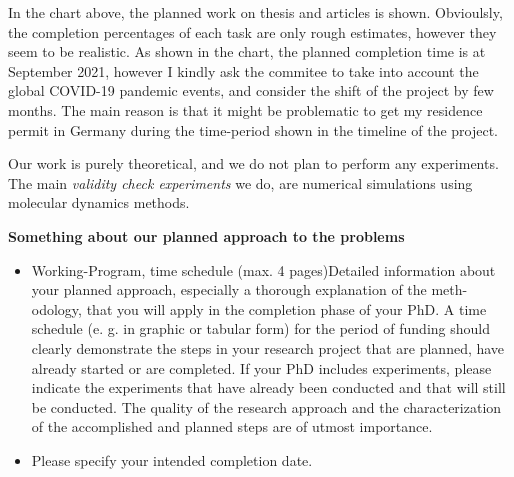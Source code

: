 \documentclass[11pt, notitlepage]{article} %
\begin{document}
In the chart above, the planned work on thesis and articles is shown. Obvioulsly, the completion percentages of each task are 
only rough estimates, however they seem to be realistic. As shown in the chart, the planned completion time is at September 2021,
however I kindly ask the commitee to take into account the global COVID-19 pandemic events, and consider the shift of the project 
by few months. The main reason is that it might be problematic to get my residence permit in Germany during the time-period 
shown in the timeline of the project.

Our work is purely theoretical, and we do not plan to perform any experiments. The main \emph{validity check experiments} 
we do, are numerical simulations using molecular dynamics methods. 

\textbf{Something about our planned approach to the problems}

\begin{itemize}
    \item Working-Program, time schedule (max. 4 pages)Detailed information about your planned approach, especially a thorough explanation of the meth-odology, 
	that you will apply in the completion phase of your  PhD. A time schedule (e. g. in graphic or  tabular  form)  for  the  period  of  
	funding  should  clearly  demonstrate  the  steps  in  your  research  project that are planned, have already started or are completed. 
	If your PhD includes experiments, please indicate the experiments that have already been conducted and that will still be conducted. 
	The  quality  of  the  research  approach  and  the  characterization  of  the  accomplished  and  planned  steps are of utmost importance.
    \item Please specify your intended completion date.
\end{itemize}

\newpage

{\small

%
}

\end{document}
